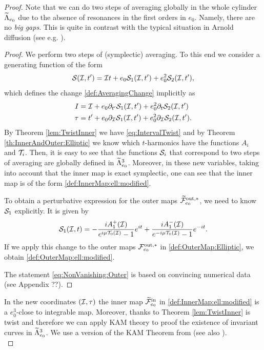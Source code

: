 \begin{proof}
  Note that we can do two steps of averaging globally in the whole cylinder $\widetilde\Lambda_{e_0}$
  due to the absence of resonances in the first orders in $e_0$. Namely, there are no \emph{big gaps}.
  This is quite in contrast  with the typical situation in Arnold diffusion (see e.g. \cite{DelshamsLS06a}).

  \begin{proof}
    We perform two steps of (symplectic) averaging. To this end we consider a generating function of the form
    \[
    \mathcal{S}(\mathcal{I}, t')=\mathcal{I} t+e_0\mathcal{S}_1(\mathcal{I}, t')+e_0^2 \mathcal{S}_2(\mathcal{I}, t'),
    \]
    which defines the change \eqref{def:AveragingChange} implicitly as
    \[
    \begin{split}
      I&=\mathcal{I}+e_0\partial_{t'}\mathcal{S}_1(\mathcal{I}, t')+e_0^2 \partial_t\mathcal{S}_2(\mathcal{I}, t')\\
      \tau&=t'+e_0\partial_{\mathcal{I}}\mathcal{S}_1(\mathcal{I}, t')+e_0^2 \partial_{\mathcal{I}}\mathcal{S}_2(\mathcal{I}, t').
    \end{split}
    \]
    By Theorem \ref{lem:TwistInner} we have  \eqref{eq:IntervalTwist} and by
    Theorem \ref{th:InnerAndOuter:Elliptic} we know which $t$-harmonics have
    the functions $A_i$ and $\mathcal{T}_i$. Then, it is easy to see that the functions $\mathcal{S}_i$
    that correspond to two steps of averaging are globally defined in $\widetilde\Lambda_{e_0}^3$.
    Moreover, in these new variables, taking into account that the inner map is exact symplectic,
    one can see that the inner map is of the form \eqref{def:InnerMap:ell:modified}.

    To obtain a perturbative expression for the outer maps $\widetilde{\mathcal{F}}_{e_0}^{\mathrm{out},\ast}$, we need
    to know  $\mathcal{S}_1$ explicitly. It is given  by
    \[
    \mathcal{S}_1(\mathcal{I}, t)=-\frac{iA_1^+(\mathcal{I})}{e^{i\mu \mathcal{T}_0(\mathcal{I})}-1}e^{it}+\frac{iA_1^-(\mathcal{I})}{e^{-i\mu \mathcal{T}_0(\mathcal{I})}-1}e^{-it}.
    \]
    If we apply this change to the outer maps $\mathcal{F}_{e_0}^{\mathrm{out},\ast}$ in \eqref{def:OuterMap:Elliptic},
    we obtain \eqref{def:OuterMap:ell:modified}.

    The statement \eqref{eq:NonVanishing:Outer} is based on convincing numerical data (see Appendix ??).
  \end{proof}

  In the new coordinates $(\mathcal{I},\tau)$ the inner map $\widetilde{\mathcal{F}}_{e_0}^{\mathrm{in}}$ in
  \eqref{def:InnerMap:ell:modified} is a $e_0^3$-close to integrable map. Moreover,
  thanks to Theorem \ref{lem:TwistInner} is twist and therefore we can apply KAM theory to
  proof the existence of invariant curves in $\widetilde\Lambda^3_{e_0}$. We use a version of the KAM Theorem
  from \cite{DelshamsLS00} (see also \cite{Herman83c}).\\




\end{proof}
